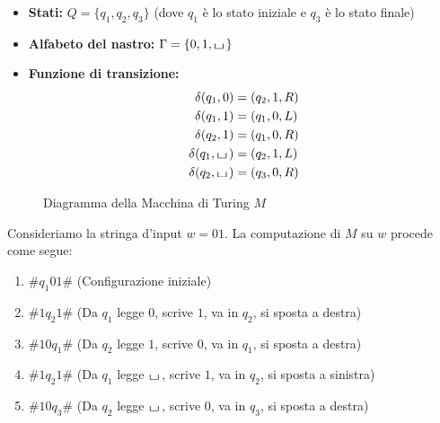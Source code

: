 \documentclass[a4paper]{article}
\theoremstyle{definition} %
\newcommand{\blankS}{\ensuremath{\raisebox{-0.15ex}{\scalebox{1.3}[0.7]{$\sqcup$}}\mkern2mu}}
\theoremstyle{remark} %
\begin{document}
\begin{itemize}
    \item \textbf{Stati:} $Q = \{q_1, q_2, q_3\}$ (dove $q_1$ è lo stato iniziale e $q_3$ è lo stato finale)
    \item \textbf{Alfabeto del nastro:} $\Gamma = \{0, 1, \blankS\}$
    \item \textbf{Funzione di transizione:}
    \begin{align}
        \delta(q_1, 0) &= (q_2, 1, R) \\
        \delta(q_1, 1) &= (q_1, 0, L) \\
        \delta(q_2, 1) &= (q_1, 0, R) \\
        \delta(q_1, \blankS) &= (q_2, 1, L) \\
        \delta(q_2, \blankS) &= (q_3, 0, R)
    \end{align}
\end{itemize}

\begin{figure}[h]
\centering
{}
\caption{Diagramma della Macchina di Turing $M$}
\end{figure}

Consideriamo la stringa d'input $w = 01$. La computazione di $M$ su $w$ procede come segue:

\begin{enumerate}
    \item $\#q_1 01\#$ \quad (Configurazione iniziale)
    \item $\#1q_2 1\#$ \quad (Da $q_1$ legge $0$, scrive $1$, va in $q_2$, si sposta a destra)
    \item $\#10q_1 \#$ \quad (Da $q_2$ legge $1$, scrive $0$, va in $q_1$, si sposta a destra)
    \item $\#1q_2 1\#$ \quad (Da $q_1$ legge \blankS, scrive $1$, va in $q_2$, si sposta a sinistra)
    \item $\#10q_3 \#$ \quad (Da $q_2$ legge \blankS, scrive $0$, va in $q_3$, si sposta a destra)
\end{enumerate}
\end{document}

